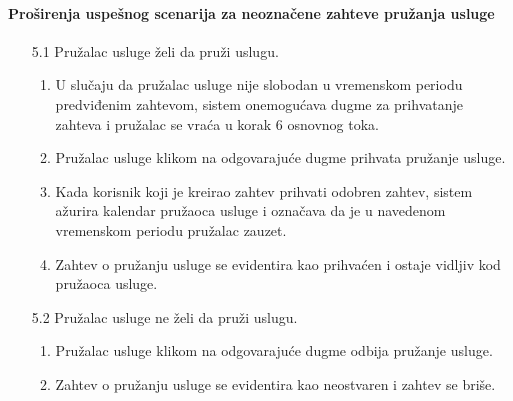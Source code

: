 \documentclass[a4paper,12pt]{report}
\begin{document}
    \paragraph*{Proširenja uspešnog scenarija za neoznačene zahteve pružanja usluge} 
    \begin{enumerate}
        \item[5.1] Pružalac usluge želi da pruži uslugu.
        \begin{enumerate}[noitemsep,topsep=-8pt]
            \item U slučaju da pružalac usluge nije slobodan u vremenskom periodu predviđenim zahtevom, sistem onemogućava dugme za prihvatanje zahteva i pružalac se vraća u korak 6 osnovnog toka. 
            \item Pružalac usluge klikom na odgovarajuće dugme prihvata pružanje usluge.
            \item Kada korisnik koji je kreirao zahtev prihvati odobren zahtev, sistem ažurira kalendar pružaoca usluge i označava da je u navedenom vremenskom periodu pružalac zauzet.
            \item Zahtev o pružanju usluge se evidentira kao prihvaćen i ostaje vidljiv kod pružaoca usluge.
        \end{enumerate}
    
        \item[5.2] Pružalac usluge ne želi da pruži uslugu.
        \begin{enumerate}[noitemsep,topsep=-8pt]
            \item Pružalac usluge klikom na odgovarajuće dugme odbija pružanje usluge.
            \item Zahtev o pružanju usluge se evidentira kao neostvaren i zahtev se briše.
        \end{enumerate}
    \end{enumerate}
    
\end{document}
